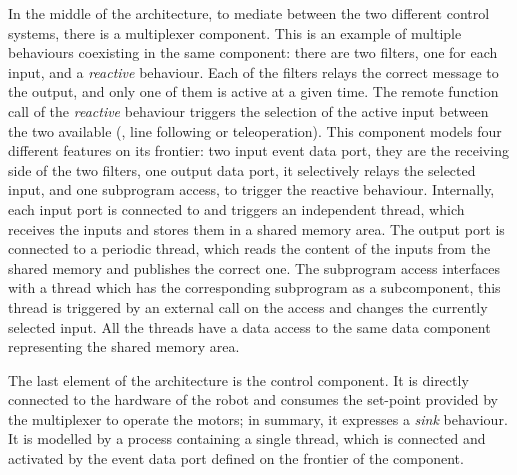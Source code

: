 In the middle of the architecture, to mediate between the two different control systems, there is a multiplexer component. This is an example of multiple behaviours coexisting in the same component: there are two filters, one for each input, and a \textit{reactive} behaviour. Each of the filters relays the correct message to the output, and only one of them is active at a given time. The remote function call of the \textit{reactive} behaviour triggers the selection of the active input between the two available (\ie, line following or teleoperation). This component models four different features on its frontier: two input event data port, they are the receiving side of the two filters, one output data port, it selectively relays the selected input, and one subprogram access, to trigger the reactive behaviour. Internally, each input port is connected to and triggers an independent thread, which receives the inputs and stores them in a shared memory area. The output port is connected to a periodic thread, which reads the content of the inputs from the shared memory and publishes the correct one. The subprogram access interfaces with a thread which has the corresponding subprogram as a subcomponent, this thread is triggered by an external call on the access and changes the currently selected input. All the threads have a data access to the same data component representing the shared memory area.

The last element of the architecture is the control component. It is directly connected to the hardware of the robot and consumes the set-point provided by the multiplexer to operate the motors; in summary, it expresses a \textit{sink} behaviour. It is modelled by a process containing a single thread, which is connected and activated by the event data port defined on the frontier of the component.

